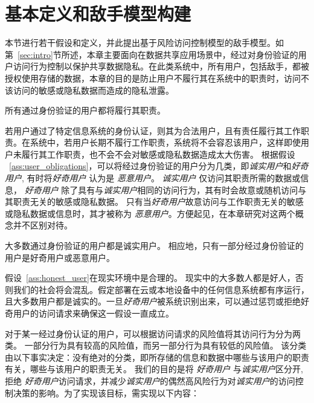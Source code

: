 \section{基本定义和敌手模型构建}
\label{sec:adversary_model}

本节进行若干假设和定义，并此提出基于风险访问控制模型的敌手模型。如第~\ref{sec:intro}节所述，本章主要面向在数据共享应用场景中，经过对身份验证的用户访问行为控制以保护共享数据隐私。在此类系统中，所有用户，包括敌手，都被授权使用存储的数据，本章的目的是防止用户不履行其在系统中的职责时，访问不该访问的敏感或隐私数据而造成的隐私泄露。

\begin{assumption}
	\label{ass:user_obligations}
	所有通过身份验证的用户都将履行其职责。
\end{assumption}

若用户通过了特定信息系统的身份认证，则其为合法用户，且有责任履行其工作职责。在系统中，若用户长期不履行工作职责，系统将不会容忍该用户，这样即使用户未履行其工作职责，也不会不会对敏感或隐私数据造成太大伤害。 根据假设 ~\ref{ass:user_obligations}，可以将经过身份验证的用户分为几类，即\emph{诚实用户}和\emph{好奇用户}, 有时将\emph{好奇用户} 认为是 \emph{恶意用户}。 \emph{诚实用户} 仅访问其职责所需的数据或信息，  \emph{好奇用户} 除了具有与\emph{诚实用户}相同的访问行为，其有时会故意或随机访问与其职责无关的敏感或隐私数据。 只有当\emph{好奇用户}故意访问与工作职责无关的敏感或隐私数据或信息时，其才被称为 \emph{恶意用户}。方便起见，在本章研究对这两个概念并不区别对待。

\begin{assumption}
	\label{ass:honest_user}
	大多数通过身份验证的用户都是诚实用户。 相应地，只有一部分经过身份验证的用户是好奇用户或恶意用户。
\end{assumption}

假设~\ref{ass:honest_user}在现实环境中是合理的。 现实中的大多数人都是好人，否则我们的社会将会混乱。假定部署在云或本地设备中的任何信息系统都有序运行，且大多数用户都是诚实的。一旦\emph{好奇用户}被系统识别出来，可以通过惩罚或拒绝好奇用户的访问请求来确保这一假设一直成立。

对于某一经过身份认证的用户，可以根据访问请求的风险值将其访问行为分为两类。 一部分行为具有较高的风险值，而另一部分行为具有较低的风险值。 该分类由以下事实决定：没有绝对的分类，即所存储的信息和数据中哪些与该用户的职责有关，哪些与该用户的职责无关。 我们的目的是将 \emph{好奇用户} 与\emph{诚实用户}区分开, 拒绝 \emph{好奇用户}访问请求，并减少\emph{诚实用户}的偶然高风险行为对\emph{诚实用户}的访问控制决策的影响。为了实现该目标，需实现以下内容：

